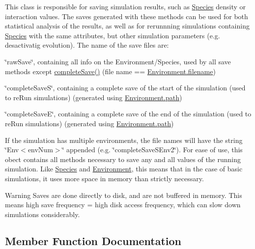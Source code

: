 This class is responsible for saving simulation results, such as \hyperlink{classSpecies}{Species} density or interaction values. The saves generated with these methods can be used for both statistical analysis of the results, as well as for rerunnning simulations containing \hyperlink{classSpecies}{Species} with the same attributes, but other simulation parameters (e.\+g. desactivatig evolution). The name of the save files are\+:
\begin{DoxyItemize}
\item \char`\"{}raw\+Save\char`\"{}, containing all info on the Environment/\+Species, used by all save methods except \hyperlink{classSave_a479ae37320e8aaaa98a5636071fb9c59}{complete\+Save()} (file name == \hyperlink{classEnvironment_afefeccf87332c116006372e3ee197452}{Environment.\+filename})
\item \char`\"{}complete\+Save\+S\char`\"{}, containing a complete save of the start of the simulation (used to re\+Run simulations) (generated using \hyperlink{classEnvironment_a27a1684288d74f2cabb8cfbd0848b14e}{Environment.\+path})
\item \char`\"{}complete\+Save\+E\char`\"{}, containing a complete save of the end of the simulation (used to re\+Run simulations) (generated using \hyperlink{classEnvironment_a27a1684288d74f2cabb8cfbd0848b14e}{Environment.\+path})
\end{DoxyItemize}

If the simulation has multiple environments, the file names will have the string \char`\"{}\+Env$<$env\+Num$>$\char`\"{} appended (e.\+g. \char`\"{}complete\+Save\+S\+Env2\char`\"{}). For ease of use, this obect contains all methods necessary to save any and all values of the running simulation. Like \hyperlink{classSpecies}{Species} and \hyperlink{classEnvironment}{Environment}, this means that in the case of basic simulations, it uses more space in memory than strictly necessary.

\begin{DoxyWarning}{Warning}
Saves are done directly to disk, and are not buffered in memory. This means high save frequency = high disk access frequency, which can slow down simulations considerably. 
\end{DoxyWarning}


\subsection{Member Function Documentation}
\mbox{\label{classSave_a479ae37320e8aaaa98a5636071fb9c59}} 
